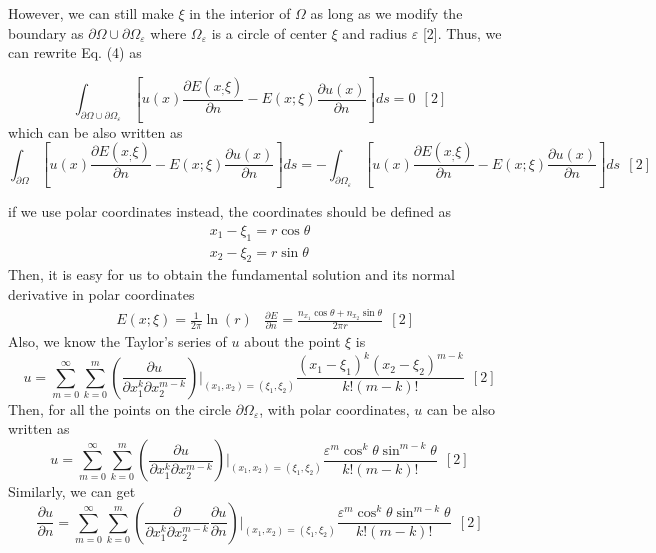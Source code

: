 \documentclass[a4paper,12pt]{article}
\begin{document}
\par However, we can still make $\xi$ in the interior of $\Omega$ as long as we modify the boundary as $\partial \Omega \cup \partial \Omega_{\varepsilon}$ where $\Omega_{\varepsilon}$ is a circle of center $\xi$ and radius $\varepsilon$ [2]. Thus, we can rewrite Eq. (4) as

\begin{equation}
\int_{\partial \Omega \cup \partial \Omega_{\varepsilon}} [u(x)\frac{\partial E(x_;\xi)}{\partial n} - E(x;\xi) \frac{\partial u(x)}{\partial n}] ds = 0 \ \ [2]
\end{equation}
which can be also written as
\begin{equation}
\int_{\partial \Omega } [u(x)\frac{\partial E(x_;\xi)}{\partial n} - E(x;\xi) \frac{\partial u(x)}{\partial n}] ds = -\int_{\partial \Omega_{\varepsilon} } [u(x)\frac{\partial E(x_;\xi)}{\partial n} - E(x;\xi) \frac{\partial u(x)}{\partial n}] ds \ \ [2]
\end{equation}

\par if we use polar coordinates instead, the coordinates should be defined as
\begin{equation}
\begin{aligned}
x_1 - \xi_1 = r \cos \theta \\
x_2 - \xi_2 = r \sin\theta
\end{aligned}
\end{equation}
Then, it is easy for us to obtain the fundamental solution and its normal derivative in polar coordinates
\begin{equation}
\begin{aligned}
& E (x;\xi) = \frac{1}{2\pi} \ln (r)
& \frac{\partial E}{\partial n} = \frac{n_{x_1} \cos\theta + n_{x_2} \sin\theta}{2\pi r} \ \ [2]
\end{aligned}
\end{equation}
Also, we know the Taylor's series of $u$ about the point $\xi$ is
\begin{equation*}
u = \sum_{m = 0}^{\infty}\sum_{k = 0}^{m } (\frac{\partial u}{\partial x_1^{k} \partial x_2^{m - k}})|_{(x_1,x_2) = (\xi_1,\xi_2)} \frac{(x_1- \xi_1)^k(x_2 - \xi_2)^{m - k}}{k!( m - k)!}  \ \ [2]
\end{equation*}
Then, for all the points on the circle $\partial \Omega_{\varepsilon}$, with polar coordinates, $u$ can be also written as 
\begin{equation}
u = \sum_{m = 0}^{\infty}\sum_{k = 0}^{m } (\frac{\partial u}{\partial x_1^{k} \partial x_2^{m - k}})|_{(x_1,x_2) = (\xi_1,\xi_2)} \frac{\varepsilon^m \cos^k \theta \sin^{m - k}\theta}{k!( m - k)!} \ \ [2]
\end{equation}
Similarly, we can get
\begin{equation}
\frac{\partial u}{\partial n} = \sum_{m = 0}^{\infty}\sum_{k = 0}^{m } (\frac{\partial}{\partial x_1^{k} \partial x_2^{m - k}}\frac{\partial u}{\partial n})|_{(x_1,x_2) = (\xi_1,\xi_2)} \frac{\varepsilon^m \cos^k \theta \sin^{m - k}\theta}{k!( m - k)!} \ \ [2]
\end{equation}
\end{document}
